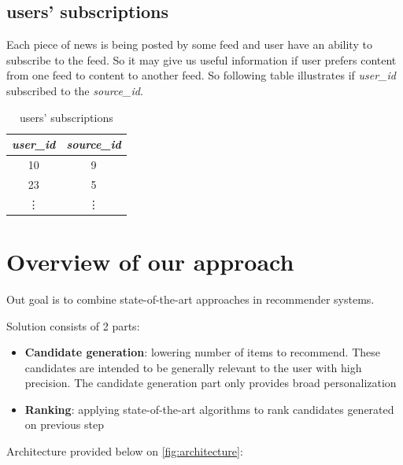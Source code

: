 \documentclass{article}
\begin{document}


\subsection*{users' subscriptions}

Each piece of news is being posted by some feed and user have an ability to subscribe to the feed. So it may give us useful information if user prefers content from one feed to content to another feed. So following table illustrates if \emph{user\_id} subscribed to the \emph{source\_id}.

\begin{table}[h]
    \centering
    \begin{tabular}{cc}
        \toprule

        \emph{user\_id} & \emph{source\_id} \\\midrule

        10 & 9  \\
        23 & 5  \\
        \vdots & \vdots  \\\bottomrule

    \end{tabular}

    \caption{users' subscriptions}
    \label{tab:subscriptions}
\end{table}


\newpage
\section{Overview of our approach}
\label{sec:overview}

Out goal is to combine state-of-the-art approaches in recommender systems.

Solution consists of 2 parts:

\begin{itemize}
    \item \textbf{Candidate generation}: lowering number of items to recommend. These candidates are intended to be generally relevant to the user with high precision. The candidate generation part only provides broad personalization
    \item \textbf{Ranking}: applying state-of-the-art algorithms to rank candidates generated on previous step
\end{itemize}

Architecture provided below on \cref{fig:architecture}:
\end{document}
